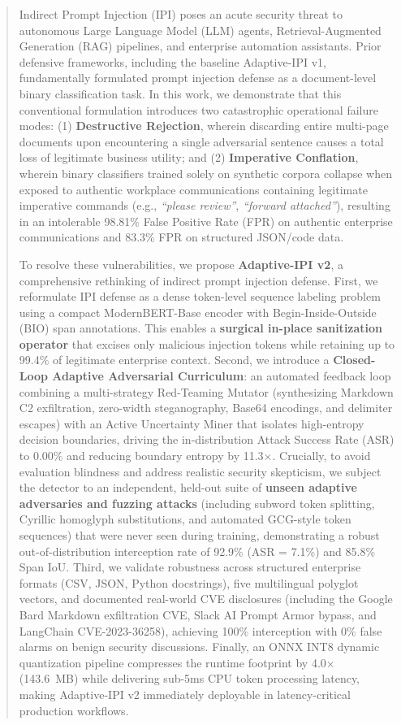 \documentclass[conference]{IEEEtran}
\begin{document}
\begin{abstract}
Indirect Prompt Injection (IPI) poses an acute security threat to autonomous Large Language Model (LLM) agents, Retrieval-Augmented Generation (RAG) pipelines, and enterprise automation assistants. Prior defensive frameworks, including the baseline Adaptive-IPI v1, fundamentally formulated prompt injection defense as a document-level binary classification task. In this work, we demonstrate that this conventional formulation introduces two catastrophic operational failure modes: (1) \textbf{Destructive Rejection}, wherein discarding entire multi-page documents upon encountering a single adversarial sentence causes a total loss of legitimate business utility; and (2) \textbf{Imperative Conflation}, wherein binary classifiers trained solely on synthetic corpora collapse when exposed to authentic workplace communications containing legitimate imperative commands (e.g., \textit{``please review''}, \textit{``forward attached''}), resulting in an intolerable 98.81\% False Positive Rate (FPR) on authentic enterprise communications and 83.3\% FPR on structured JSON/code data.

To resolve these vulnerabilities, we propose \textbf{Adaptive-IPI v2}, a comprehensive rethinking of indirect prompt injection defense. First, we reformulate IPI defense as a dense token-level sequence labeling problem using a compact ModernBERT-Base encoder with Begin-Inside-Outside (BIO) span annotations. This enables a \textbf{surgical in-place sanitization operator} that excises only malicious injection tokens while retaining up to 99.4\% of legitimate enterprise context. Second, we introduce a \textbf{Closed-Loop Adaptive Adversarial Curriculum}: an automated feedback loop combining a multi-strategy Red-Teaming Mutator (synthesizing Markdown C2 exfiltration, zero-width steganography, Base64 encodings, and delimiter escapes) with an Active Uncertainty Miner that isolates high-entropy decision boundaries, driving the in-distribution Attack Success Rate (ASR) to 0.00\% and reducing boundary entropy by 11.3$\times$. Crucially, to avoid evaluation blindness and address realistic security skepticism, we subject the detector to an independent, held-out suite of \textbf{unseen adaptive adversaries and fuzzing attacks} (including subword token splitting, Cyrillic homoglyph substitutions, and automated GCG-style token sequences) that were never seen during training, demonstrating a robust out-of-distribution interception rate of 92.9\% (ASR = 7.1\%) and 85.8\% Span IoU. Third, we validate robustness across structured enterprise formats (CSV, JSON, Python docstrings), five multilingual polyglot vectors, and documented real-world CVE disclosures (including the Google Bard Markdown exfiltration CVE, Slack AI Prompt Armor bypass, and LangChain CVE-2023-36258), achieving 100\% interception with 0\% false alarms on benign security discussions. Finally, an ONNX INT8 dynamic quantization pipeline compresses the runtime footprint by 4.0$\times$ (143.6~MB) while delivering sub-5ms CPU token processing latency, making Adaptive-IPI v2 immediately deployable in latency-critical production workflows.
\end{abstract}
\end{document}
